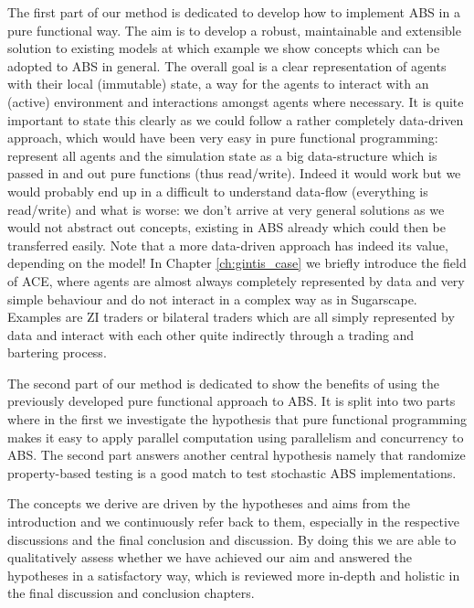 The first part of our method is dedicated to develop how to implement ABS in a pure functional way. The aim is to develop a robust, maintainable and extensible solution to existing models at which example we show concepts which can be adopted to ABS in general. The overall goal is a clear representation of agents with their local (immutable) state, a way for the agents to interact with an (active) environment and interactions amongst agents where necessary. It is quite important to state this clearly as we could follow a rather completely data-driven approach, which would have been very easy in pure functional programming: represent all agents and the simulation state as a big data-structure which is passed in and out pure functions (thus read/write). Indeed it would work but we would probably end up in a difficult to understand data-flow (everything is read/write) and what is worse: we don't arrive at very general solutions as we would not abstract out concepts, existing in ABS already which could then be transferred easily. Note that a more data-driven approach has indeed its value, depending on the model! In Chapter \ref{ch:gintis_case} we briefly introduce the field of ACE, where agents are almost always completely represented by data and very simple behaviour and do not interact in a complex way as in Sugarscape. Examples are ZI traders or bilateral traders which are all simply represented by data and interact with each other quite indirectly through a trading and bartering process.

The second part of our method is dedicated to show the benefits of using the previously developed pure functional approach to ABS. It is split into two parts where in the first we investigate the hypothesis that pure functional programming makes it easy to apply parallel computation using parallelism and concurrency to ABS. The second part answers another central hypothesis namely that randomize property-based testing is a good match to test stochastic ABS implementations.

The concepts we derive are driven by the hypotheses and aims from the introduction and we continuously refer back to them, especially in the respective discussions and the final conclusion and discussion. By doing this we are able to qualitatively assess whether we have achieved our aim and answered the hypotheses in a satisfactory way, which is reviewed more in-depth and holistic in the final discussion and conclusion chapters.